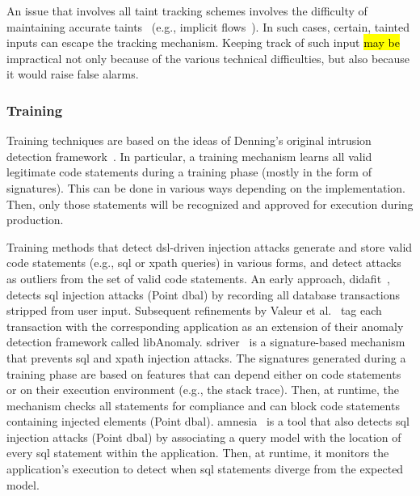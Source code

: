 \documentclass[10pt,journal,compsoc]{IEEEtran}
\newcommand{\hlc}[2][yellow]{ {\sethlcolor{#1} \hl{#2}} }
\begin{document}
An issue that involves all taint tracking schemes involves
the difficulty of maintaining accurate taints~\cite{GMPS11}
(e.g., implicit flows~\cite{ME07}).
In such cases, certain, tainted inputs can escape the tracking mechanism.
Keeping track of such input \hlc[yellow]{may be} impractical not only because of the
various technical difficulties, but also because it would raise false alarms.

\subsubsection{Training}
\label{sec:train}
\vspace{-0.7mm}

Training techniques are based on the ideas of Denning's original
intrusion detection framework~\cite{Den87}. In particular, a training
mechanism learns all valid legitimate code statements during a
training phase (mostly in the form of signatures). This can be done in
various ways depending on the implementation. Then, only those
statements will be recognized and approved for execution during
production.

Training methods that detect {\sc dsl}-driven injection attacks
generate and store valid code statements (e.g., {\sc sql} or {\sc
  xp}ath queries) in various forms, and detect attacks as outliers
from the set of valid code statements. An early approach,
{\sc didafit}~\cite{LLW02}, detects {\sc sql} injection attacks (Point
{\sc dbal}) by recording all database transactions
stripped from user input. Subsequent
refinements by Valeur et al.~\cite{VMV05} tag each transaction with
the corresponding application as an extension of their anomaly
detection framework called libAnomaly.
{\sc sd}river~\cite{MS09,MKLS11} is a signature-based mechanism
that prevents {\sc sql} and {\sc xp}ath injection attacks. The
signatures generated during a training phase are based on features
that can depend either on code statements or on their execution
environment (e.g., the stack trace). Then, at runtime, the mechanism
checks all statements for compliance and can block code statements
containing injected elements (Point {\sc dbal}).
{\sc amnesia}~\cite{HO05b} is a tool that also detects
{\sc sql} injection attacks (Point {\sc dbal}) by associating a query model
with the location of every {\sc sql} statement within the application.
Then, at runtime, it monitors the application's execution to detect
when {\sc sql} statements diverge from the expected model.
\end{document}
